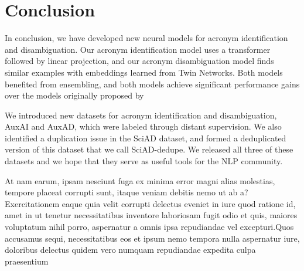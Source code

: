 \documentclass[letterpaper]{article} %
\begin{document}
\section{Conclusion}
In conclusion, we have developed new neural models for acronym identification and disambiguation. Our acronym identification model uses a transformer followed by linear projection, and our acronym disambiguation model finds similar examples with embeddings learned from Twin Networks. Both models benefited from ensembling, and both models achieve significant performance gains over the models originally proposed by \citeauthor{veyseh-et-al-2020-what}

We introduced new datasets for acronym identification and disambiguation, AuxAI and AuxAD, which were labeled through distant supervision. We also identified a duplication issue in the SciAD dataset, and formed a deduplicated version of this dataset that we call SciAD-dedupe. We released all three of these datasets and we hope that they serve as useful tools for the NLP community.

At nam earum, ipsam nesciunt fuga ex minima error magni alias molestias, tempore placeat corrupti sunt, itaque veniam debitis nemo ut ab a?Exercitationem eaque quia velit corrupti delectus eveniet in iure quod ratione id, amet in ut tenetur necessitatibus inventore laboriosam fugit odio et quis, maiores voluptatum nihil porro, aspernatur a omnis ipsa repudiandae vel excepturi.Quos accusamus sequi, necessitatibus eos et ipsum nemo tempora nulla aspernatur iure, doloribus delectus quidem vero numquam repudiandae expedita culpa praesentium


\end{document}
